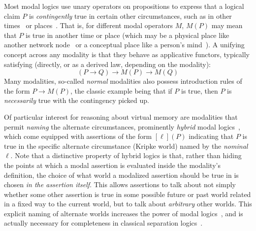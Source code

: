 Most modal logics use unary operators on propositions to express that a logical claim $P$ is \emph{contingently} true 
in certain other circumstances, such as in other times~\cite{pnueli1977temporal} or places~\cite{gordon2019modal}. That is, for 
different modal operators $M$, $M(P)$ may mean that $P$ is true in another time or place (which may be a physical place 
like another network node~\cite{murphy2008type,gordon2019modal} or a conceptual place like a person's 
mind~\cite{hintikka1962knowledge}). A unifying concept across any modality is that they behave as applicative functors, 
typically satisfying (directly, or as a derived law, depending on the modality):
\[ (P\rightarrow Q) \rightarrow M(P) \rightarrow M(Q)\]
Many modalities, so-called \emph{normal} modalities also possess introduction rules of the form $P\rightarrow M(P)$, 
the classic example being that if $P$ is true, then $P$ is \emph{necessarily} true with the contingency picked up.%

Of particular interest for reasoning about virtual memory are modalities that permit \emph{naming} the alternate 
circumstances, prominently \emph{hybrid} modal logics~\cite{blackburn1995hybrid,areces2001hybrid}, which come equipped 
with assertions of the form $[\ell](P)$ indicating that $P$ is true in the specific alternate circumstance (Kripke world)
 named by the \emph{nominal} $\ell$. Note that a distinctive property of hybrid logics is that, rather than hiding
the points at which a modal assertion is evaluated inside the modality's definition, the choice of what world a modalized
assertion should be true in is chosen \emph{in the assertion itself}. This allows assertions to talk about not simply whether some other assertion
is true in some possible future or past world related in a fixed way to the current world, but to talk about \emph{arbitrary}
other worlds. This explicit naming of alternate worlds increases the power of modal logics~\cite{blackburn1995hybrid}, and is actually
necessary for completeness in classical separation logics~\cite{brotherston2014parametric}.

